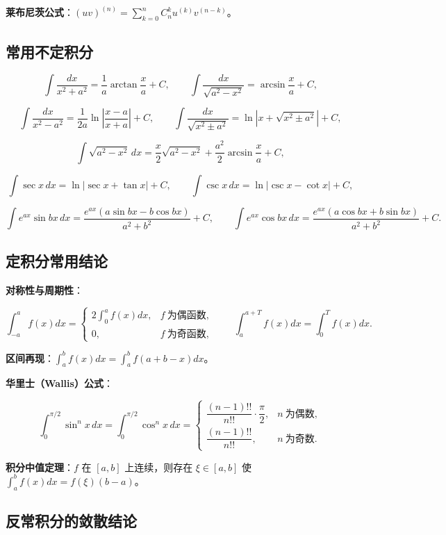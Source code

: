 \documentclass[11pt,openany,UTF8]{ctexbook}
\begin{document}
\textbf{莱布尼茨公式}：$(uv)^{(n)}=\sum_{k=0}^{n}C_n^k u^{(k)}v^{(n-k)}$。

\subsection{常用不定积分}

\[\int \frac{dx}{x^2+a^2}=\frac1a\arctan\frac xa+C,\qquad
\int \frac{dx}{\sqrt{a^2-x^2}}=\arcsin\frac xa+C,\]

\[\int \frac{dx}{x^2-a^2}=\frac{1}{2a}\ln\left|\frac{x-a}{x+a}\right|+C,\qquad
\int \frac{dx}{\sqrt{x^2\pm a^2}}=\ln\left|x+\sqrt{x^2\pm a^2}\right|+C,\]

\[\int \sqrt{a^2-x^2}\,dx=\frac x2\sqrt{a^2-x^2}+\frac{a^2}{2}\arcsin\frac xa+C,\]

\[\int \sec x\,dx=\ln|\sec x+\tan x|+C,\qquad \int \csc x\,dx=\ln|\csc x-\cot x|+C,\]

\[\int e^{ax}\sin bx\,dx=\frac{e^{ax}(a\sin bx-b\cos bx)}{a^2+b^2}+C,\qquad
\int e^{ax}\cos bx\,dx=\frac{e^{ax}(a\cos bx+b\sin bx)}{a^2+b^2}+C.\]

\subsection{定积分常用结论}

\textbf{对称性与周期性}：

\[\int_{-a}^{a}f(x)dx=\begin{cases}2\displaystyle\int_0^af(x)dx,& f\ \text{为偶函数},\\[4pt] 0,& f\ \text{为奇函数},\end{cases}
\qquad \int_a^{a+T}f(x)dx=\int_0^Tf(x)dx .\]

\textbf{区间再现}：$\displaystyle\int_a^bf(x)dx=\int_a^bf(a+b-x)dx$。

\textbf{华里士（Wallis）公式}：

\[\int_0^{\pi/2}\sin^n x\,dx=\int_0^{\pi/2}\cos^n x\,dx=
\begin{cases}\dfrac{(n-1)!!}{n!!}\cdot\dfrac{\pi}{2},& n\ \text{为偶数},\\[8pt]
\dfrac{(n-1)!!}{n!!},& n\ \text{为奇数}.\end{cases}\]

\textbf{积分中值定理}：$f$ 在 $[a,b]$ 上连续，则存在 $\xi\in[a,b]$ 使 $\int_a^bf(x)dx=f(\xi)(b-a)$。

\subsection{反常积分的敛散结论}
\end{document}
